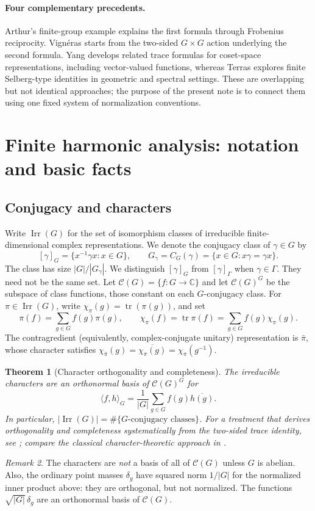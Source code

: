 \documentclass[12pt]{article}
\newtheorem{theorem}{Theorem}[section]
\theoremstyle{remark}
\newtheorem{remark}[theorem]{Remark}
\newcommand{\C}{\mathbb C}
\newcommand{\tr}{\operatorname{tr}}
\newcommand{\Irr}{\operatorname{Irr}}
\newcommand{\cG}{\mathcal C(G)}
\begin{document}
\paragraph{Four complementary precedents.}
Arthur's finite-group example \cite[Example~2]{ArthurHecke1989}
explains the first formula through Frobenius reciprocity.
Vign\'eras \cite[\S1]{Vigneras1991} starts from the two-sided
$G\times G$ action underlying the second formula.
Yang \cite{Yang2006} develops related trace formulas for
coset-space representations, including vector-valued functions,
whereas Terras \cite[Chs.~22--23]{Terras1999} explores finite
Selberg-type identities in geometric and spectral settings.
These are overlapping but not identical approaches; the purpose
of the present note is to connect them using one fixed system
of normalization conventions.

\section{Finite harmonic analysis: notation and basic facts}
\label{sec:harmonic}
\subsection{Conjugacy and characters}
Write $\Irr(G)$ for the set of isomorphism classes of irreducible
finite-dimensional complex representations.  We denote the conjugacy
class of $\gamma\in G$ by
\[
 [\gamma]_G=\{x^{-1}\gamma x:x\in G\},\qquad
 G_\gamma=C_G(\gamma)=\{x\in G:x\gamma=\gamma x\}.
\]
The class has size $|G|/|G_\gamma|$.
We distinguish $[\gamma]_G$ from $[\gamma]_\Gamma$ when $\gamma\in\Gamma$.
They need not be the same set. Let $\cG=\{f:G\to\C\}$ and let
$\cG^G$ be the subspace of class functions, those constant on each
$G$-conjugacy class.
For $\pi\in\Irr(G)$, write $\chi_\pi(g)=\tr(\pi(g))$, and set
\[
 \pi(f)=\sum_{g\in G}f(g)\pi(g),\qquad
 \chi_\pi(f)=\tr\pi(f)=\sum_{g\in G}f(g)\chi_\pi(g).
\]
The contragredient (equivalently, complex-conjugate unitary)
representation is $\bar\pi$, whose character satisfies
$\chi_{\bar\pi}(g)=\overline{\chi_\pi(g)}=\chi_\pi(g^{-1})$.

\begin{theorem}[Character orthogonality and completeness]\label{thm:chars}
The irreducible characters are an orthonormal basis of $\cG^G$ for
\[
 \langle f,h\rangle_G
   =\frac1{|G|}\sum_{g\in G}f(g)\overline{h(g)}.
\]
In particular,
$|\Irr(G)|=\#\{G\text{-conjugacy classes}\}$.
For a treatment that derives orthogonality and completeness
systematically from the two-sided trace identity, see
\cite[\S\S1.1--1.9]{Vigneras1991}; compare the classical
character-theoretic approach in \cite{Serre}.
\end{theorem}
\begin{remark}
The characters are \emph{not} a basis of all of $\cG$ unless $G$ is
abelian.  Also, the ordinary point masses $\delta_g$ have squared norm
$1/|G|$ for the normalized inner product above: they are orthogonal,
but not normalized.  The functions $\sqrt{|G|}\,\delta_g$ are an
orthonormal basis of $\cG$.
\end{remark}
\end{document}
